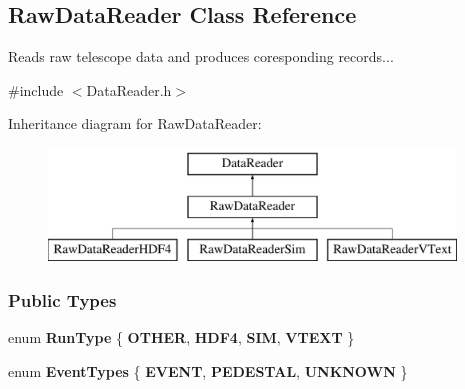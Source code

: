 \hypertarget{classRawDataReader}{
\subsection{RawDataReader Class Reference}
\label{classRawDataReader}
}


Reads raw telescope data and produces coresponding records...  




{\ttfamily \#include $<$DataReader.h$>$}

Inheritance diagram for RawDataReader:\begin{figure}[H]
\begin{center}
\leavevmode
\includegraphics[height=3.000000cm]{classRawDataReader}
\end{center}
\end{figure}
\subsubsection*{Public Types}
\begin{DoxyCompactItemize}
\item 
enum {\bfseries RunType} \{ {\bfseries OTHER}, 
{\bfseries HDF4}, 
{\bfseries SIM}, 
{\bfseries VTEXT}
 \}
\item 
enum {\bfseries EventTypes} \{ {\bfseries EVENT}, 
{\bfseries PEDESTAL}, 
{\bfseries UNKNOWN}
 \}
\end{DoxyCompactItemize}
